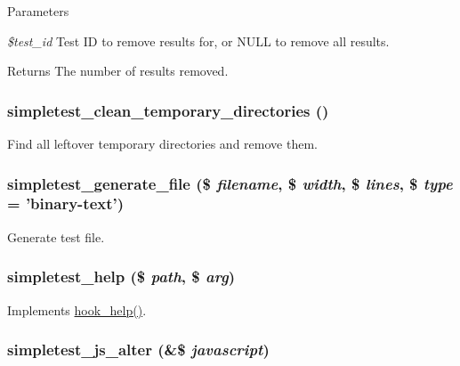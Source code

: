 \begin{DoxyParams}{Parameters}
\item[{\em \$test\_\-id}]Test ID to remove results for, or NULL to remove all results. \end{DoxyParams}
\begin{DoxyReturn}{Returns}
The number of results removed. 
\end{DoxyReturn}
\hypertarget{simpletest_8module_a4be9d49870bfc35792cd9dc4dd1b389b}{
\subsubsection[{simpletest\_\-clean\_\-temporary\_\-directories}]{\setlength{\rightskip}{0pt plus 5cm}simpletest\_\-clean\_\-temporary\_\-directories ()}}
\label{simpletest_8module_a4be9d49870bfc35792cd9dc4dd1b389b}
Find all leftover temporary directories and remove them. \hypertarget{simpletest_8module_aebcb4a918f91dad598f8267982ef4756}{
\subsubsection[{simpletest\_\-generate\_\-file}]{\setlength{\rightskip}{0pt plus 5cm}simpletest\_\-generate\_\-file (\$ {\em filename}, \/  \$ {\em width}, \/  \$ {\em lines}, \/  \$ {\em type} = {\ttfamily 'binary-\/text'})}}
\label{simpletest_8module_aebcb4a918f91dad598f8267982ef4756}
Generate test file. \hypertarget{simpletest_8module_ad5b505f2b0b217de9322d5dd81f6ea95}{
\subsubsection[{simpletest\_\-help}]{\setlength{\rightskip}{0pt plus 5cm}simpletest\_\-help (\$ {\em path}, \/  \$ {\em arg})}}
\label{simpletest_8module_ad5b505f2b0b217de9322d5dd81f6ea95}
Implements \hyperlink{group__hooks_ga5589c2714a782738e8851c4c90231f0e}{hook\_\-help()}. \hypertarget{simpletest_8module_aaa4dfc94748777a27c27d02366a7cab7}{
\subsubsection[{simpletest\_\-js\_\-alter}]{\setlength{\rightskip}{0pt plus 5cm}simpletest\_\-js\_\-alter (\&\$ {\em javascript})}}

